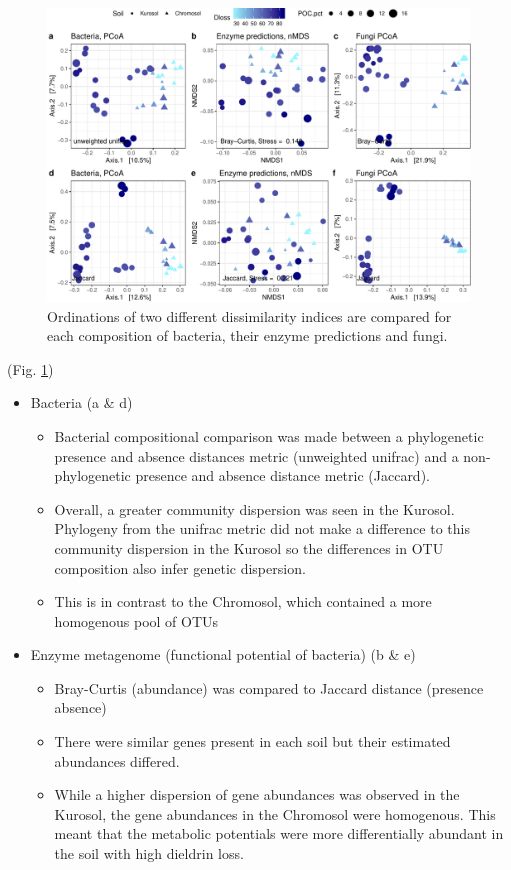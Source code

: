 \documentclass[
]{article}
\providecommand{\tightlist}{%
  \setlength{\itemsep}{0pt}\setlength{\parskip}{0pt}}
\begin{document}
\begin{figure}
\centering
\includegraphics{M2_Results_files/figure-latex/pcoa-1.pdf}
\caption{\label{fig:pcoa}Ordinations of two different dissimilarity indices are compared for each composition of bacteria, their enzyme predictions and fungi.}
\end{figure}

(Fig. \ref{fig:pcoa})

\begin{itemize}
\tightlist
\item
  Bacteria (a \& d)

  \begin{itemize}
  \tightlist
  \item
    Bacterial compositional comparison was made between a phylogenetic presence and absence distances metric (unweighted unifrac) and a non-phylogenetic presence and absence distance metric (Jaccard).
  \item
    Overall, a greater community dispersion was seen in the Kurosol. Phylogeny from the unifrac metric did not make a difference to this community dispersion in the Kurosol so the differences in OTU composition also infer genetic dispersion.
  \item
    This is in contrast to the Chromosol, which contained a more homogenous pool of OTUs
  \end{itemize}
\item
  Enzyme metagenome (functional potential of bacteria) (b \& e)

  \begin{itemize}
  \tightlist
  \item
    Bray-Curtis (abundance) was compared to Jaccard distance (presence absence)
  \item
    There were similar genes present in each soil but their estimated abundances differed.
  \item
    While a higher dispersion of gene abundances was observed in the Kurosol, the gene abundances in the Chromosol were homogenous. This meant that the metabolic potentials were more differentially abundant in the soil with high dieldrin loss.
  \end{itemize}
\end{itemize}
\end{document}
